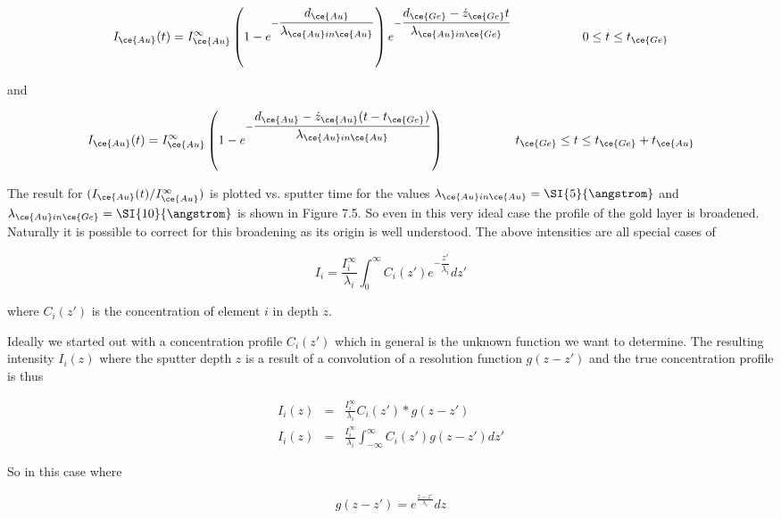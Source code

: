 \begin{equation}
I_{\ce{Au}}(t)=I^{\infty}_{\ce{Au}}\left(1-e^{-\dfrac{d_{\ce{Au}}}{\lambda_{\ce{Au} in \ce{Au}}}}\right)e^{-\dfrac{d_{\ce{Ge}}-\dot{z}_{\ce{Ge}} t}{\lambda_{\ce{Au} in \ce{Ge}}}} \hspace{2cm} 0\leq t\leq t_{\ce{Ge}}
\end{equation}

and

\begin{equation}
I_{\ce{Au}}(t)=I^{\infty}_{\ce{Au}}\left(1-e^{-\dfrac{d_{\ce{Au}}-\dot{z}_{\ce{Au}}(t-t_{\ce{Ge}})}{\lambda_{\ce{Au} in \ce{Au}}}}\right) \hspace{2cm} t_{\ce{Ge}}\leq t\leq t_{\ce{Ge}}+t_{\ce{Au}}
\end{equation}

The result for $(I_{\ce{Au}}(t)/I_{\ce{Au}}^{\infty})$ is plotted vs. sputter time for the values $\lambda_{\ce{Au} in \ce{Au}}=\SI{5}{\angstrom}$ and $\lambda_{\ce{Au} in \ce{Ge}}=\SI{10}{\angstrom}$ is shown in Figure 7.5. So even in this very ideal case the profile of the gold layer is broadened. Naturally it is possible to correct for this broadening as its origin is well understood. The above intensities are all special cases of

\begin{equation}
I_i=\frac{I^{\infty}_i}{\lambda_i}\int^{\infty}_0C_i(z\prime)e^{-\dfrac{z\prime}{\lambda_i}}dz\prime
\end{equation}

where $C_i(z\prime)$ is the concentration of element $i$ in depth $z$.

Ideally we started out with a concentration profile $C_i(z\prime)$ which in general is the unknown function we want to determine. The resulting intensity $I_i(z)$ where the sputter depth $z$ is a result of a convolution of a resolution function $g(z-z\prime)$ and the true concentration profile is thus

\begin{eqnarray}
I_i(z)	& =	& \frac{I^{\infty}_i}{\lambda_i}C_i(z\prime)*g(z-z')\\
I_i(z)	& =	& \frac{I^{\infty}_i}{\lambda_i} \int^{\infty}_{-\infty}C_i(z\prime)g(z-z\prime)dz\prime
\end{eqnarray}

So in this case where

\begin{equation}
g(z-z\prime)=e^{\frac{z-z\prime}{\lambda_i}}dz
\end{equation}

